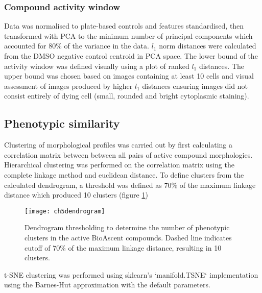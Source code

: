 \documentclass[a4paper,11pt,twoside,openright]{scrbook}
\begin{document}
\subsubsection{Compound activity window}
Data was normalised to plate-based controls and features standardised, then transformed with PCA to the minimum number of principal components which accounted for 80\% of the variance in the data.
$l_1$ norm distances were calculated from the DMSO negative control centroid in PCA space.
The lower bound of the activity window was defined visually using a plot of ranked $l_1$ distances.
The upper bound was chosen based on images containing at least 10 cells and visual assessment of images produced by higher $l_1$ distances ensuring images did not consist entirely of dying cell (small, rounded and bright cytoplasmic staining).


\subsection{Phenotypic similarity}
Clustering of morphological profiles was carried out by first calculating a correlation matrix between between all pairs of active compound morphologies.
Hierarchical clustering was performed on the correlation matrix using the complete linkage method and euclidean distance.
To define clusters from the calculated dendrogram, a threshold was defined as 70\% of the maximum linkage distance which produced 10 clusters (figure \ref{figure:dendrogram_cut})

\begin{figure}
    \captionsetup{width=0.8\textwidth}
    \caption[Dendrogram threshold to determine clusters]{
Dendrogram thresholding to determine the number of phenotypic clusters in the active BioAscent compounds.
Dashed line indicates cutoff of 70\% of the maximum linkage distance, resulting in 10 clusters.
}
    \texttt{[image: ch5dendrogram]}
    \label{figure:dendrogram_cut}
\end{figure}

t-SNE clustering was performed using sklearn's `manifold.TSNE` implementation using the Barnes-Hut approximation with the default parameters.
\end{document}
